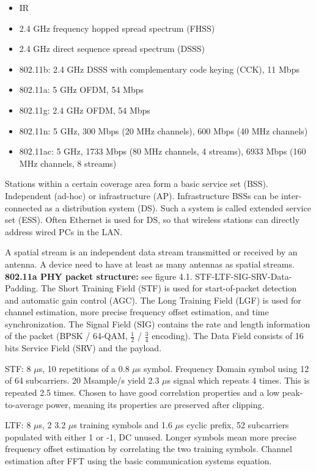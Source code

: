 \begin{itemize}
	\item IR
	\item 2.4 GHz frequency hopped spread spectrum (FHSS)
	\item 2.4 GHz direct sequence spread spectrum (DSSS)
	\item 802.11b: 2.4 GHz DSSS with complementary code keying (CCK), 11 Mbps
	\item 802.11a: 5 GHz OFDM, 54 Mbps
	\item 802.11g: 2.4 GHz OFDM, 54 Mbps
	\item 802.11n: 5 GHz, 300 Mbps (20 MHz channels), 600 Mbps (40 MHz channels)
	\item 802.11ac: 5 GHz, 1733 Mbps (80 MHz channels, 4 streams), 6933 Mbps (160 MHz channels, 8 streams)
\end{itemize}

Stations within a certain coverage area form a basic service set (BSS). Independent (ad-hoc) or infrastructure (AP). Infrastructure BSSs can be inter-connected as a distribution system (DS). Such a system is called extended service set (ESS). Often Ethernet is used for DS, so that wireless stations can directly address wired PCs in the LAN.

A spatial stream is an independent data stream transmitted or received by an antenna. A device need to have at least as many antennas as spatial streams.\\

\textbf{802.11a PHY packet structure:} see \cite{perahia2013} figure 4.1. STF-LTF-SIG-SRV-Data-Padding. The Short Training Field (STF) is used for start-of-packet detection and automatic gain control (AGC). The Long Training Field (LGF) is used for channel estimation, more precise frequency offset estimation, and time synchronization. The Signal Field (SIG) contains the rate and length information of the packet (BPSK / 64-QAM, $\frac{1}{2}$ / $\frac{3}{4}$ encoding). The Data Field consists of 16 bits Service Field (SRV) and the payload.

STF: 8 $\mu$s, 10 repetitions of a 0.8 $\mu$s symbol. Frequency Domain symbol using 12 of 64 subcarriers. 20 Msample/s yield 2.3 $\mu$s signal which repeats 4 times. This is repeated 2.5 times. Chosen to have good correlation properties and a low peak-to-average power, meaning its properties are preserved after clipping.

LTF: 8 $\mu$s, 2 3.2 $\mu$s training symbols and 1.6 $\mu$s cyclic prefix, 52 subcarriers populated with either 1 or -1, DC unused. Longer symbols mean more precise frequency offset estimation by correlating the two training symbols. Channel estimation after FFT using the basic communication systems equation.

